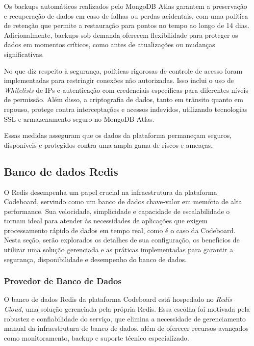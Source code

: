 Os backups automáticos realizados pelo MongoDB Atlas garantem a preservação e recuperação de dados em caso de falhas ou perdas acidentais, com uma política de retenção que permite a restauração para pontos no tempo ao longo de 14 dias. Adicionalmente, backups sob demanda oferecem flexibilidade para proteger os dados em momentos críticos, como antes de atualizações ou mudanças significativas.

No que diz respeito à segurança, políticas rigorosas de controle de acesso foram implementadas para restringir conexões não autorizadas. Isso inclui o uso de \emph{Whitelists} de IPs e autenticação com credenciais específicas para diferentes níveis de permissão. Além disso, a criptografia de dados, tanto em trânsito quanto em repouso, protege contra interceptações e acessos indevidos, utilizando tecnologias SSL e armazenamento seguro no MongoDB Atlas.

Essas medidas asseguram que os dados da plataforma permaneçam seguros, disponíveis e protegidos contra uma ampla gama de riscos e ameaças.

\subsection{Banco de dados Redis}

O Redis desempenha um papel crucial na infraestrutura da plataforma Codeboard, servindo como um banco de dados chave-valor em memória de alta performance. Sua velocidade, simplicidade e capacidade de escalabilidade o tornam ideal para atender às necessidades de aplicações que exigem processamento rápido de dados em tempo real, como é o caso da Codeboard. Nesta seção, serão explorados os detalhes de sua configuração, os benefícios de utilizar uma solução gerenciada e as práticas implementadas para garantir a segurança, disponibilidade e desempenho do banco de dados.

\subsubsection{Provedor de Banco de Dados}

O banco de dados Redis da plataforma Codeboard está hospedado no \emph{Redis Cloud}, uma solução gerenciada pela própria Redis. Essa escolha foi motivada pela robustez e confiabilidade do serviço, que elimina a necessidade de gerenciamento manual da infraestrutura de banco de dados, além de oferecer recursos avançados como monitoramento, backup e suporte técnico especializado.

